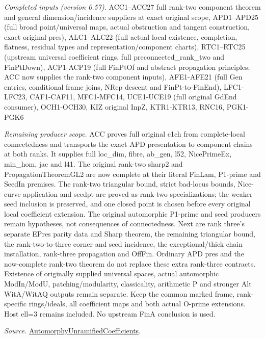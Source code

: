 \emph{Completed inputs (version 0.57).} ACC1–ACC27 full rank-two component theorem and general dimension/incidence suppliers at exact original scope, APD1–APD25 (full broad point/universal maps, actual obstruction and tangent construction, exact original pres), ALC1–ALC22 (full actual local existence, completion, flatness, residual types and representation/component charts), RTC1–RTC25 (upstream universal coefficient rings, full preconnected\_\allowbreak rank\_\allowbreak two and FinPtDown), ACP1-ACP19 (full FinPtOf and abstract propagation principles; ACC now supplies the rank-two component inputs), AFE1-AFE21 (full Gen entries, conditional frame joins, NRep descent and FinPt-to-FinEnd), LFC1-LFC23, CAF1-CAF11, MFC1-MFC14, UCE1-UCE19 (full original GdEnd consumer), OCH1-OCH30, KIZ original InpZ, KTR1-KTR13, RNC16, PGK1-PGK6

\emph{Remaining producer scope.} ACC proves full original c1ch from complete-local connectedness and transports the exact APD presentation to component chains at both ranks. It supplies full loc\_\allowbreak dim, fibre, ab\_\allowbreak gen, l52, NicePrimeEx, min\_\allowbreak hom, jac and l41. The original rank-two sharp2 and PropagationTheoremGL2 are now complete at their literal FinLam, P1-prime and SeedIn premises. The rank-two triangular bound, strict bad-locus bounds, Nice-curve application and seedpt are proved as rank-two specializations; the weaker seed inclusion is preserved, and one closed point is chosen before every original local coefficient extension. The original automorphic P1-prime and seed producers remain hypotheses, not consequences of connectedness. Next are rank three's separate EPres parity data and Sharp theorem, the remaining triangular bound, the rank-two-to-three corner and seed incidence, the exceptional/thick chain installation, rank-three propagation and OffFin. Ordinary APD pres and the now-complete rank-two theorem do not replace these extra rank-three contracts. Existence of originally supplied universal spaces, actual automorphic ModIn/ModU, patching/modularity, classicality, arithmetic P and stronger Alt WitA/WitAQ outputs remain separate. Keep the common marked frame, rank-specific rings/ideals, all coefficient maps and both actual O-prime extensions. Host ell=3 remains included. No upstream FinA conclusion is used.

\emph{Source.} \href{https://github.com/CocoSgt/riemann-hypothesis-lean/blob/7cbf7a0c32fca1badf05931879a37c3f8a2b03b4/src/Development/AutomorphicArithmetic/AutomorphicVarieties/AutomorphicCases/AutomorphyUnramifiedCoefficients.lean#L24-L27}{AutomorphyUnramifiedCoefficients}.

